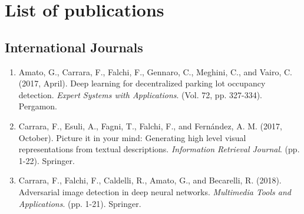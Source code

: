 \chapter*{List of publications}


\section*{International Journals}
\begin{enumerate}
    \item Amato, G., Carrara, F., Falchi, F., Gennaro, C., Meghini, C., and Vairo, C. (2017, April). Deep learning for decentralized parking lot occupancy detection. \emph{Expert Systems with Applications}. (Vol. 72, pp. 327-334). Pergamon.
    \item Carrara, F., Esuli, A., Fagni, T., Falchi, F., and Fernández, A. M. (2017, October). Picture it in your mind: Generating high level visual representations from textual descriptions. \emph{Information Retrieval Journal}. (pp. 1-22). Springer.
    \item Carrara, F., Falchi, F., Caldelli, R., Amato, G., and Becarelli, R. (2018). Adversarial image detection in deep neural networks. \emph{Multimedia Tools and Applications}. (pp. 1-21). Springer.
    
\end{enumerate}

